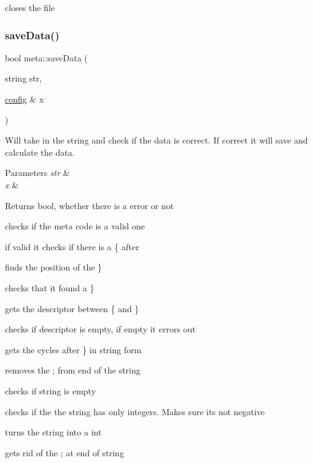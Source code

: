 closes the file \mbox{\label{classmeta_afecfa24d119f15e3be5e01f37769a180}} 
\subsubsection{\texorpdfstring{saveData()}{saveData()}}
{\footnotesize\ttfamily bool meta\+::save\+Data (\begin{DoxyParamCaption}\item[{string}]{str,  }\item[{\mbox{\hyperlink{classconfig}{config}} \&}]{x }\end{DoxyParamCaption})}



Will take in the string and check if the data is correct. If correct it will save and calculate the data. 


\begin{DoxyParams}{Parameters}
{\em str} & \\
\hline
{\em x} & \\
\hline
\end{DoxyParams}
\begin{DoxyReturn}{Returns}
bool, whether there is a error or not 
\end{DoxyReturn}
checks if the meta code is a valid one

if valid it checks if there is a \textquotesingle{}\{\textquotesingle{} after

finds the position of the \textquotesingle{}\}\textquotesingle{}

checks that it found a \textquotesingle{}\}\textquotesingle{}

gets the descriptor between \textquotesingle{}\{\textquotesingle{} and \textquotesingle{}\}\textquotesingle{}

checks if descriptor is empty, if empty it errors out

gets the cycles after \textquotesingle{}\}\textquotesingle{} in string form

removes the \textquotesingle{};\textquotesingle{} from end of the string

checks if string is empty

checks if the the string has only integers. Makes sure its not negative

turns the string into a int

gets rid of the \textquotesingle{};\textquotesingle{} at end of string


